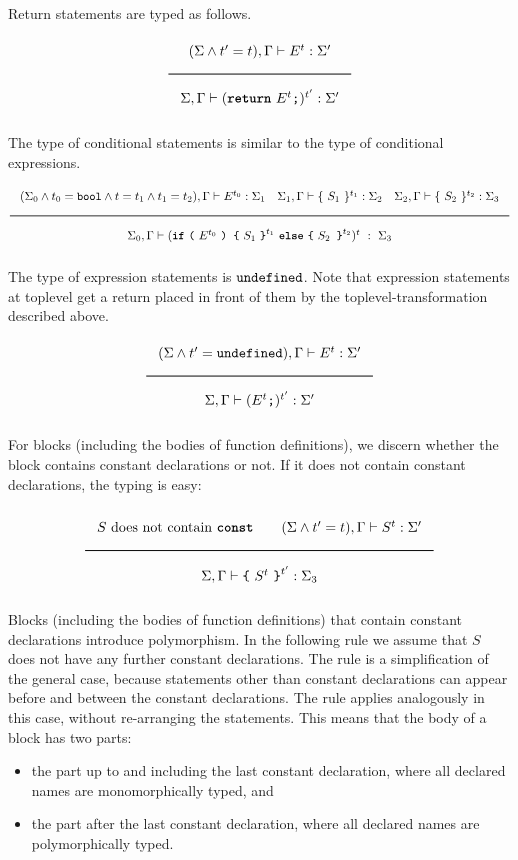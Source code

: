\noindent
Return statements are typed as follows.
\[
\Rule{
(\Sigma \wedge t' = t), \Gamma \vdash E^{t} : \Sigma' }{
\Sigma, \Gamma \vdash (\Return\ E^{t} \texttt{;})^{t'} : \Sigma'}
\]

\noindent
The type of conditional statements is similar to the type of conditional expressions.
\[\Rule{(\Sigma_0 \wedge t_0 = \Bool \wedge t = t_1 \wedge t_1 = t_2),
          \Gamma \vdash E^{t_0} : \Sigma_1 \quad
\Sigma_1, \Gamma \vdash \{\ S_1\ \}^{t_1} : \Sigma_2 \quad
\Sigma_2, \Gamma \vdash \{\ S_2\ \}^{t_2} : \Sigma_3 }{
  \Sigma_0, \Gamma \vdash (\If\ \texttt{(}\ E^{t_0}\ \texttt{)\ \{}\ S_1\ \texttt{\}}^{t_1}\ \Else\ \texttt{\{}\ S_2\texttt{ \}}^{t_2})^t\ :\ \Sigma_3}
\]


\noindent
The type of expression statements is $\texttt{undefined}$. Note that expression statements
at toplevel get a return placed in front of them by the toplevel-transformation described above.
\[
\Rule{
(\Sigma \wedge t' = \Undefined), \Gamma \vdash E^{t} : \Sigma' }{
\Sigma, \Gamma \vdash (E^{t} \texttt{;})^{t'} : \Sigma'}
\]

\noindent
For blocks (including the bodies of function definitions), we discern whether the
block contains constant declarations or not. If it does not contain constant
declarations, the typing is easy:

\[
\Rule{
  S\ \textrm{does not contain }\Const \qquad
  (\Sigma \wedge t' = t), \Gamma \vdash S^{t} : \Sigma' }{
\Sigma, \Gamma \vdash \Lc \ S^{t} \ \Rc^{t'}  : \Sigma_3}
\]

\noindent
Blocks (including the bodies of function definitions) that 
contain constant declarations introduce polymorphism. In the following
rule we assume that $S$ does not have any further constant declarations. The rule
is a simplification of the general case, because statements other than constant
declarations can appear before and between the constant declarations. The rule
applies analogously in this case, without re-arranging the statements. This means
that the body of a block has two parts:
\begin{itemize}
\item the part up to and including the last constant declaration, where all
  declared names are monomorphically typed, and
\item the part after the last constant declaration, where all declared names
  are polymorphically typed.
\end{itemize}


